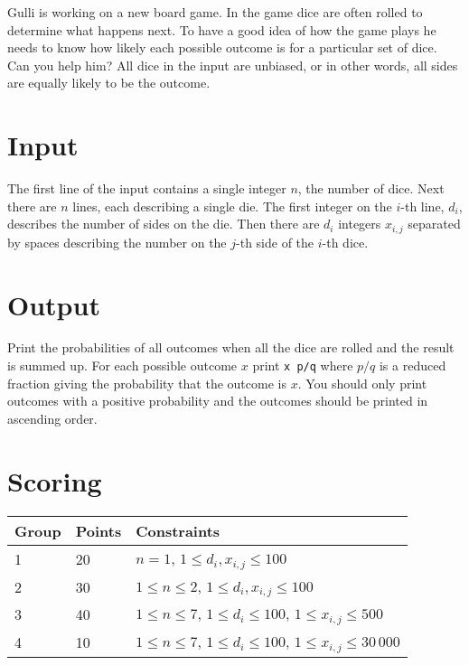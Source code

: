 
Gulli is working on a new board game. In the game dice are often rolled to determine what happens next. To have a good idea of how
the game plays he needs to know how likely each possible outcome is for a particular set of dice. Can you help him? All dice in the
input are unbiased, or in other words, all sides are equally likely to be the outcome.

\section*{Input}
The first line of the input contains a single integer $n$, the number of dice. Next there are $n$ lines, each describing a single die.
The first integer on the $i$-th line, $d_i$, describes the number of sides on the die. Then there are $d_i$ integers $x_{i, j}$ separated
by spaces describing the number on the $j$-th side of the $i$-th dice.

\section*{Output}
Print the probabilities of all outcomes when all the dice are rolled and the result is summed up. For each possible outcome $x$ print
\texttt{x p/q} where $p/q$ is a reduced fraction giving the probability that the outcome is $x$. You should only print outcomes with a positive
probability and the outcomes should be printed in ascending order.

\section*{Scoring}
\begin{tabular}{|l|l|l|}
\hline
Group & Points & Constraints \\ \hline
1     & 20   & $n = 1$, $1 \leq d_i, x_{i, j} \leq 100$ \\ \hline
2     & 30   & $1 \leq n \leq 2$, $1 \leq d_i, x_{i, j} \leq 100$ \\ \hline
3     & 40   & $1 \leq n \leq 7$, $1 \leq d_i \leq 100$, $1 \leq x_{i,j} \leq 500$ \\ \hline
4     & 10   & $1 \leq n \leq 7$, $1 \leq d_i \leq 100$, $1 \leq x_{i,j} \leq 30\,000$\\ \hline
\end{tabular}

